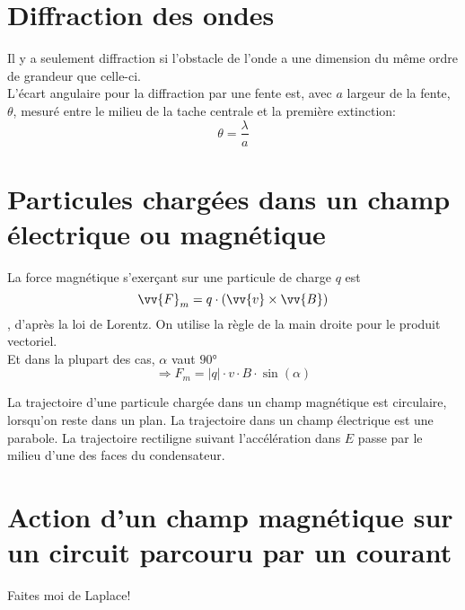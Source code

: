 \section{Diffraction des ondes}

\begin{Definition}

Il y a seulement diffraction si l'obstacle de l'onde a une dimension du même ordre de grandeur que celle-ci.\\
L'écart angulaire pour la diffraction par une fente est, avec $a$ largeur de la fente, $\theta$, mesuré entre le milieu de la tache centrale et la première extinction:
$$\theta=\dfrac{\lambda}{a}$$

\end{Definition}


\section{Particules chargées dans un champ électrique ou magnétique}

\begin{Definition}

La force magnétique s'exerçant sur une particule de charge $q$ est
$$\vv{F}_{m} = q \cdot (\vv{v}\times \vv{B})$$, 
d'après la loi de Lorentz. On utilise la règle de la main droite pour le produit vectoriel. \\
Et dans la plupart des cas, $\alpha$ vaut $\ang{90}$
$$\Rightarrow F_{m} = |q| \cdot v \cdot B \cdot \sin(\alpha)$$

La trajectoire d'une particule chargée dans un champ magnétique est circulaire, lorsqu'on reste dans un plan. La trajectoire dans un champ électrique est une parabole. La trajectoire rectiligne suivant l'accélération dans $E$ passe par le milieu d'une des faces du condensateur. 

\end{Definition}


\section{Action d'un champ magnétique sur un circuit parcouru par un courant}


\begin{Definition}
Faites moi de Laplace!
\end{Definition}







